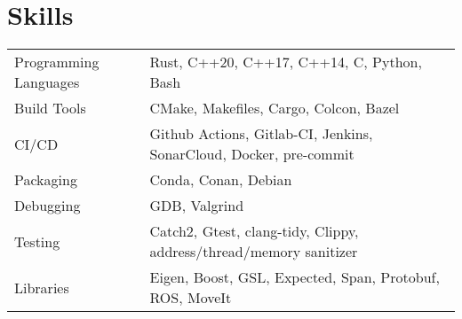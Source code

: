 \documentclass[a4paper,12pt]{article}
\begin{document}
\section{Skills}
\begin{tabularx}{\linewidth}{@{}l X@{}}
Programming Languages &  \normalsize{Rust, C++20, C++17, C++14, C, Python, Bash}\\
Build Tools &  \normalsize{CMake, Makefiles, Cargo, Colcon, Bazel}\\
CI/CD  &  \normalsize{Github Actions, Gitlab-CI, Jenkins, SonarCloud, Docker, pre-commit}\\
Packaging  &  \normalsize{Conda, Conan, Debian}\\
Debugging  &  \normalsize{GDB, Valgrind}\\
Testing  &  \normalsize{Catch2, Gtest, clang-tidy, Clippy, address/thread/memory sanitizer}\\
Libraries  &  \normalsize{Eigen, Boost, GSL, Expected, Span, Protobuf, ROS, MoveIt}\\
\end{tabularx}
\end{document}
